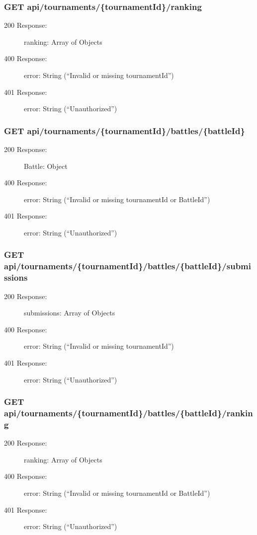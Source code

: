 \documentclass{Configuration_Files/Template}
\begin{document}
\subsubsection{GET api/tournaments/\{tournamentId\}/ranking}
\begin{description}
    \item[200 Response:] ranking: Array of Objects
    \item[400 Response:] error: String (“Invalid or missing tournamentId”)
    \item[401 Response:] error: String (“Unauthorized”)
\end{description}

\subsubsection{GET api/tournaments/\{tournamentId\}/battles/\{battleId\}}
\begin{description}
    \item[200 Response:] Battle: Object
    \item[400 Response:] error: String (“Invalid or missing tournamentId or BattleId”)
    \item[401 Response:] error: String (“Unauthorized”)
\end{description}

\subsubsection{GET api/tournaments/\{tournamentId\}/battles/\{battleId\}/submissions}
\begin{description}
    \item[200 Response:] submissions: Array of Objects
    \item[400 Response:] error: String (“Invalid or missing tournamentId”)
    \item[401 Response:] error: String (“Unauthorized”)
\end{description}

\subsubsection{GET api/tournaments/\{tournamentId\}/battles/\{battleId\}/ranking}
\begin{description}
    \item[200 Response:] ranking: Array of Objects
    \item[400 Response:] error: String (“Invalid or missing tournamentId or BattleId”)
    \item[401 Response:] error: String (“Unauthorized”)
\end{description}
\end{document}
